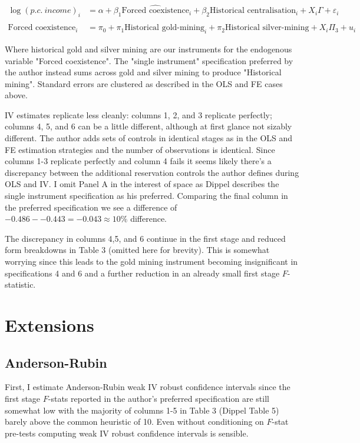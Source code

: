 \documentclass[12pt]{article}
\begin{document}
\begin{align*}
    \log(p.c. \ income)_i &= \alpha + \beta_1 \widehat{\text{Forced coexistence}}_i   + \beta_2 \text{Historical centralisation}_i + X_i \Gamma  + \varepsilon_i \\ \\
\text{Forced coexistence}_i &= \pi_0 + \pi_1 \text{Historical gold-mining}_i + \pi_2 \text{Historical silver-mining} + X_i \Pi_3 + u_i
\end{align*}

Where historical gold and silver mining are our instruments for the endogenous variable "Forced coexistence". The "single instrument" specification preferred by the author instead sums across gold and silver mining to produce "Historical mining".
Standard errors are clustered as described in the OLS and FE cases above.


IV estimates replicate less cleanly: columns 1, 2, and 3 replicate perfectly; columns 4, 5, and 6 can be a little different, although at first glance not sizably different. The author 
adds sets of controls in identical stages as in the OLS and FE estimation strategies and the number of observations is identical. Since columns 1-3 
replicate perfectly and column 4 fails it seems likely there's a discrepancy between the additional reservation controls the author defines during OLS
and IV. I omit Panel A in the interest of space as Dippel describes the single instrument specification as his preferred. Comparing the final column in the preferred specification 
we see a difference of $-0.486 - - 0.443 = -0.043 \approx 10\%$ difference.

% 


 The discrepancy in columns 4,5, and 6 continue in the first stage and reduced form breakdowns in Table 3 (omitted here for brevity). This is
somewhat worrying since this leads to the gold mining instrument becoming insignificant in specifications 4 and 6 and a further reduction in an already small 
first stage $F$-statistic. 
\section{Extensions}
\subsection{Anderson-Rubin}

First, I estimate Anderson-Rubin weak IV robust confidence intervals since the first stage $F$-stats reported in the author's preferred 
specification are still somewhat low with the majority of columns 1-5 in Table 3 (Dippel Table 5) barely above the common heuristic of 10. Even
without conditioning on $F$-stat pre-tests computing weak IV robust confidence intervals is sensible.
\end{document}
